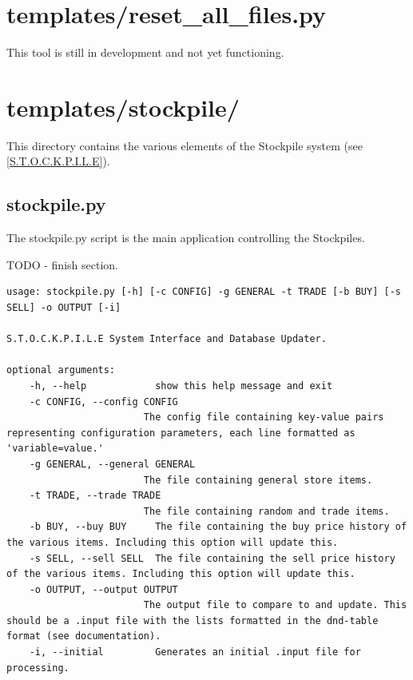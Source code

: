 \section{templates/reset\_all\_files.py}

This tool is still in development and not yet functioning.



















\section{templates/stockpile/}

This directory contains the various elements of the Stockpile system (see \ref{S.T.O.C.K.P.I.L.E}).

\subsection{stockpile.py}

The stockpile.py script is the main application controlling the Stockpiles.

TODO - finish section.

\begin{lstlisting}
usage: stockpile.py [-h] [-c CONFIG] -g GENERAL -t TRADE [-b BUY] [-s SELL] -o OUTPUT [-i]

S.T.O.C.K.P.I.L.E System Interface and Database Updater.

optional arguments:
	-h, --help            show this help message and exit
	-c CONFIG, --config CONFIG
	                    The config file containing key-value pairs representing configuration parameters, each line formatted as 'variable=value.'
	-g GENERAL, --general GENERAL
	                    The file containing general store items.
	-t TRADE, --trade TRADE
	                    The file containing random and trade items.
	-b BUY, --buy BUY     The file containing the buy price history of the various items. Including this option will update this.
	-s SELL, --sell SELL  The file containing the sell price history of the various items. Including this option will update this.
	-o OUTPUT, --output OUTPUT
	                    The output file to compare to and update. This should be a .input file with the lists formatted in the dnd-table format (see documentation).
	-i, --initial         Generates an initial .input file for processing.
\end{lstlisting}


